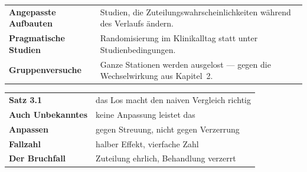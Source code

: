 \begin{forschung}
\begin{center}
{\small
\renewcommand{\arraystretch}{1.45}
\begin{tabular}{@{}P{3.2cm}P{5.0cm}@{}}
\toprule
\textbf{Angepasste Auf\-bauten} & Studien, die Zuteilungswahrscheinlichkeiten während des Verlaufs ändern.\\
\textbf{Pragmatische Studien} & Randomisierung im Klinikalltag statt unter Studienbedingungen.\\
\textbf{Gruppenversuche} & Ganze Stationen werden ausgelost --- gegen die Wechselwirkung aus Kapitel~2.\\
\bottomrule
\end{tabular}}
\end{center}

\begin{center}
\begin{minipage}{0.88\textwidth}
\end{minipage}
\end{center}
\end{forschung}

\begin{merksatz}
\begin{center}
\renewcommand{\arraystretch}{1.5}
\begin{tabular}{@{}P{3.0cm}P{5.6cm}@{}}
\toprule
\textbf{Satz 3.1} & das Los macht den naiven Vergleich richtig\\
\textbf{Auch Unbekanntes} & keine Anpassung leistet das\\
\textbf{Anpassen} & gegen Streuung, nicht gegen Verzerrung\\
\textbf{Fallzahl} & halber Effekt, vierfache Zahl\\
\textbf{Der Bruchfall} & Zuteilung ehrlich, Behandlung verzerrt\\
\bottomrule
\end{tabular}
\end{center}

\begin{center}
\begin{minipage}{0.88\textwidth}
\end{minipage}
\end{center}
\end{merksatz}
